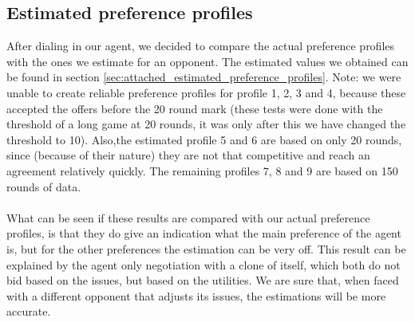 \subsection{Estimated preference profiles}

After dialing in our agent, we decided to compare the actual preference profiles with the ones we estimate for an opponent.
The estimated values we obtained can be found in section \ref{sec:attached_estimated_preference_profiles}. Note: we were unable to create reliable preference profiles for profile 1, 2, 3 and 4, because these accepted the offers before the 20 round mark (these tests were done with the threshold of a long game at 20 rounds, it was only after this we have changed the threshold to 10). Also,the estimated profile 5 and 6 are based on only 20 rounds, since (because of their nature) they are not that competitive and reach an agreement relatively quickly. The remaining profiles 7, 8 and 9 are based on 150 rounds of data.
\\\\
What can be seen if these results are compared with our actual preference profiles, is that they do give an indication what the main preference of the agent is, but for the other preferences the estimation can be very off. This result can be explained by the agent only negotiation with a clone of itself, which both do not bid based on the issues, but based on the utilities. We are sure that, when faced with a different opponent that adjusts its issues, the estimations will be more accurate.